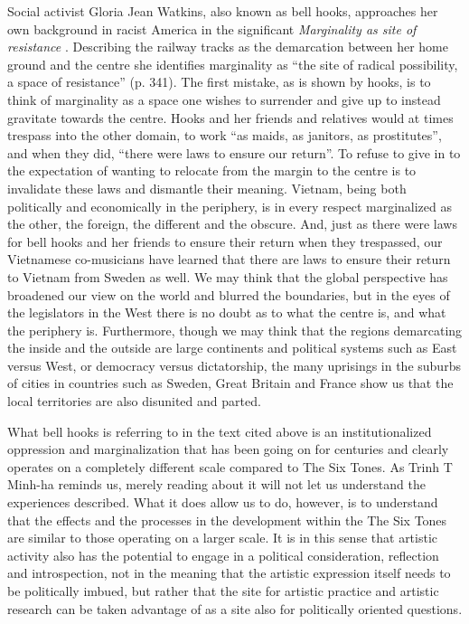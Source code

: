 \documentclass[a4paper]{article}
\begin{document}
Social activist Gloria Jean Watkins, also known as bell hooks, approaches her own background in racist America in the significant \emph{Marginality as site of resistance} \citep{HooksBell1990}. Describing the railway tracks as the demarcation between her home ground and the centre she identifies marginality as ``the site of radical possibility, a space of resistance'' (p. 341). The first mistake, as is shown by hooks, is to think of marginality as a space one wishes to surrender and give up to instead gravitate towards the centre. Hooks and her friends and relatives would at times trespass into the other domain, to work ``as maids, as janitors, as prostitutes'', and when they did, ``there were laws to ensure our return''. To refuse to give in to the expectation of wanting to relocate from the margin to the centre is to invalidate these laws and dismantle their meaning. Vietnam, being both politically and economically in the periphery, is in every respect marginalized as the other, the foreign, the different and the obscure. And, just as there were laws for bell hooks and her friends to ensure their return when they trespassed, our Vietnamese co-musicians have learned that there are laws to ensure their return to Vietnam from Sweden as well. We may think that the global perspective has broadened our view on the world and blurred the boundaries, but in the eyes of the legislators in the West there is no doubt as to what the centre is, and what the periphery is. Furthermore, though we may think that the regions demarcating the inside and the outside are large continents and political systems such as East versus West, or democracy versus dictatorship, the many uprisings in the suburbs of cities in countries such as Sweden, Great Britain and France show us that the local territories are also disunited and parted.

What bell hooks is referring to in the text cited above is an institutionalized oppression and marginalization that has been going on for centuries and clearly operates on a completely different scale compared to The Six Tones. As Trinh T Minh-ha reminds us, merely reading about it will not let us understand the experiences described. What it does allow us to do, however, is to understand that the effects and the processes in the development within the The Six Tones are similar to those operating on a larger scale. 
It is in this sense that artistic activity also has the potential to engage in a political consideration, reflection and introspection, not in the meaning that the artistic expression itself needs to be politically imbued, but rather that the site for artistic practice and artistic research can be taken advantage of as a site also for politically oriented questions. 
\end{document}
